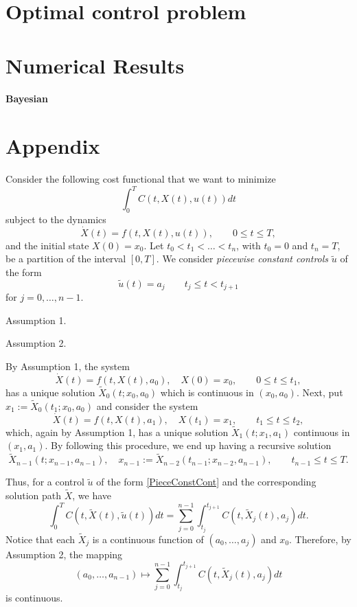 \documentclass[a4paper,10pt, 5p]{elsarticle}
\begin{document}
    \section{Optimal control problem}

    \section{Numerical Results}

    \paragraph{Bayesian}


    \section{Appendix}

Consider the following cost functional that we want to minimize
  \begin{equation}\label{costFunctional}
  \int_0^T C(t,X(t),u(t)) dt
  \end{equation}
subject to the dynamics
  \begin{equation}\label{dynamics}
  \dot{X}(t) = f(t,X(t),u(t)),  \qquad    0\leq t \leq T,
  \end{equation}
and the initial state $X(0)=x_0$. Let $t_0<t_1<\ldots <t_n$, with $t_0=0$ and $t_n=T$, be a partition of the interval $[0,T]$. We consider {\it piecewise constant controls} $\tilde{u}$ of the form
         \begin{equation}\label{PieceConstCont}
  \tilde{u}(t) = a_j\qquad t_j\leq t < t_{j+1}
         \end{equation}
 for $j=0,\ldots,n-1$.

{\sc Assumption 1}.


{\sc Assumption 2}.

By Assumption 1, the system
    \[    \dot{X}(t) = f(t,X(t),a_0), \quad X(0)=x_0, \qquad    0\leq t \leq t_1,
  \]
has a unique solution $\tilde{X}_0(t;x_0,a_0)$ which is continuous in $(x_0,a_0)$.  Next, put $x_1:=\tilde{X}_0(t_1;x_0,a_0)$ and consider the system
    \[    \dot{X}(t) = f(t,X(t),a_1), \quad X(t_1)=x_1, \qquad    t_1\leq t \leq t_2,
  \]
which, again by Assumption 1, has a unique solution $\tilde{X}_1(t;x_1,a_1)$ continuous in $(x_1,a_1)$. By following this procedure, we end up having a recursive solution
	\[  \tilde{X}_{n-1}(t;x_{n-1},a_{n-1}),\quad   x_{n-1}:=\tilde{X}_{n-2}(t_{n-1};x_{n-2},a_{n-1}),     \qquad    t_{n-1}\leq t \leq T. \]

Thus, for a control $\tilde{u}$ of the form \eqref{PieceConstCont} and the corresponding solution path $\tilde{X}$, we have
	\[
	\int_0^T C(t,\tilde{X}(t),\tilde{u}(t)) dt   =     \sum_{j=0}^{n-1}   \int_{t_j}^{t_{j+1}} C(t,\tilde{X}_j(t),a_j) dt.
	\]
Notice that each $\tilde{X}_j$ is a continuous function of $(a_0,\ldots,a_j)$	 and $x_0$. Therefore, by Assumption 2, the mapping
		\[
		(a_0,\ldots,a_{n-1}) \mapsto  \sum_{j=0}^{n-1}   \int_{t_j}^{t_{j+1}} C(t,\tilde{X}_j(t),a_j) dt
		\]
is continuous.

    \nocite{*}
    
    
\end{document}
